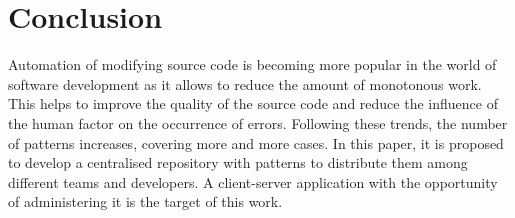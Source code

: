 \documentclass[letterpaper, 10 pt, conference]{ieeeconf}  %
\begin{document}
\section{Conclusion}
\label{section:conclusion}

Automation of modifying source code is becoming more popular in the world of
software development as it allows to reduce the amount of monotonous work. 
This helps to improve the quality of the source code and reduce the
influence of the human factor on the occurrence of errors. 
Following these trends, the number of patterns increases, covering more 
and more cases. 
In this paper, it is proposed to develop a centralised repository with 
patterns to distribute them among different teams and developers. 
A client-server application with the opportunity of administering it is the
target of this work.

\addtolength{\textheight}{-12cm}   %







\end{document}
